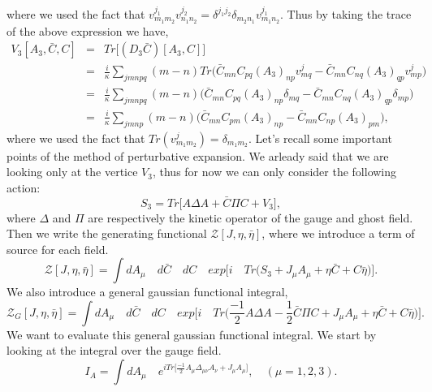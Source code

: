 \documentclass[a4paper,11pt]{article} %
\numberwithin{equation}{section} %
\numberwithin{figure}{section} %
\theoremstyle{plain} %
\theoremstyle{definition} %
\theoremstyle{remark} %
\begin{document}
where we used the fact that $ v^{j_1}_{m_1 m_2 } v^{j_2}_{ n_1 n_2 } = \delta^{j_1 j_2} \delta_{m_2 n_1} v^{j_1}_{m_1 n_2 }$. Thus by taking the trace of the above expression we have,
\begin{eqnarray*}
 V_{3}[A_3,\bar{C},C] &=& Tr \Big[ (D_3 \bar{C})[A_3,C] \Big] \\ 
                      &=& \frac{i}{\kappa} \sum_{j m n p q} ( m - n ) Tr \Bigg( \bar{C}_{m n} C_{pq} (A_3)_{n p} v^{j}_{m q} - \bar{C}_{m n}  C_{n q} (A_3)_{q p} v^{j}_{m p} \Bigg) \\ 
                      &=& \frac{i}{\kappa} \sum_{j m n p q} ( m - n ) \Bigg( \bar{C}_{m n} C_{pq} (A_3)_{n p} \delta_{m q} - \bar{C}_{m n}  C_{n q} (A_3)_{q p} \delta_{m p} \Bigg) \\ 
                      &=& \frac{i}{\kappa} \sum_{j m n p} ( m - n ) \Bigg( \bar{C}_{m n} C_{pm} (A_3)_{n p} - \bar{C}_{m n}  C_{n p} (A_3)_{p m} \Bigg),
\end{eqnarray*}
where we used the fact that $Tr(v^{j}_{m_1 m_2})=\delta_{m_1 m_2}$.
Let's recall some important points of the method of perturbative expansion. We arleady said that we are looking only at the vertice $V_3$, thus for now we can only consider the following action:
\begin{equation*}
 S_3 = Tr \big[ A \Delta A + \bar{C} \Pi C + V_3 \big],
\end{equation*}
where $\Delta$ and $\Pi$ are respectively the kinetic operator of the gauge and ghost field. Then we write the generating functional $\mathcal{Z}[J,\eta, \bar{\eta}]$, where we introduce a term of source for each field.
\begin{equation*}
 \mathcal{Z}[J,\eta, \bar{\eta}] = \int dA_{\mu}  \quad d\bar{C}  \quad dC \quad exp\Bigg[ i \quad Tr\Big( S_3 + J_{\mu} A_{\mu} + \eta \bar{C} + C \bar{\eta} \Big) \Bigg]. 
\end{equation*}
We also introduce a general gaussian functional integral,
\begin{equation*}
 \mathcal{Z}_{G}[J,\eta, \bar{\eta}] = \int dA_{\mu}  \quad d\bar{C}  \quad dC \quad exp\Bigg[ i \quad Tr\Big( \frac{-1}{2} A \Delta A - \frac{1}{2}\bar{C} \Pi C + J_{\mu} A_{\mu} + \eta \bar{C} + C \bar{\eta} \Big) \Bigg]. 
\end{equation*}
We want to evaluate this general gaussian functional integral. We start by looking at the integral over the gauge field.
\begin{equation*}
 I_A = \int dA_{\mu} \quad e^{i Tr\big[ \frac{-1}{2} A_{\mu} \Delta_{\mu \nu} A_{\nu} + J_{\mu} A_{\mu} \big] }, \quad (\mu = 1, 2, 3).
\end{equation*}
\end{document}
